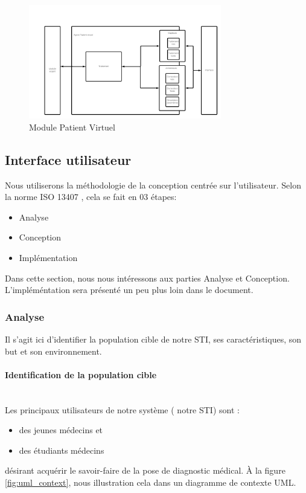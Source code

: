     \begin{figure}[H]
        \centering
        \includegraphics[width=0.75\textwidth]{figures/conc-patient virtuel.png}
        \captionsetup{justification=centering}
        \caption{Module Patient Virtuel}
        \label{fig:5}
    \end{figure}
    
    \subsection{Interface utilisateur}
    Nous utiliserons la méthodologie de la conception centrée sur l'utilisateur. Selon la norme ISO 13407 \cite{iso13407}, cela se fait en 03 étapes:
    \begin{itemize}
        \item Analyse
        \item Conception
        \item Implémentation
    \end{itemize}

    Dans cette section, nous nous intéressons aux parties Analyse et Conception. L'impléméntation sera présenté un peu plus loin dans le document.
    
    \subsubsection{Analyse}
    Il s'agit ici d'identifier la population cible de notre STI, ses caractéristiques, son but et son environnement.
    
    \paragraph{Identification de la population cible} \hfill \\
    Les principaux utilisateurs de notre système ( notre STI) sont :
    \begin{itemize}
        \item des jeunes médecins et
        \item des étudiants médecins
    \end{itemize}
    désirant acquérir le savoir-faire de la pose de diagnostic médical.  À la figure \ref{fig:uml_context}, nous illustration cela dans un diagramme de contexte UML.
    
